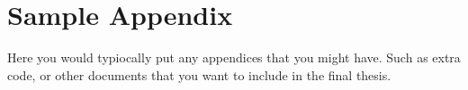 \chapter{Sample Appendix\label{apndxA}}

Here you would typiocally put any appendices that you might have.
Such as extra code, or other documents that you want to include in the final thesis.

\lipsum


